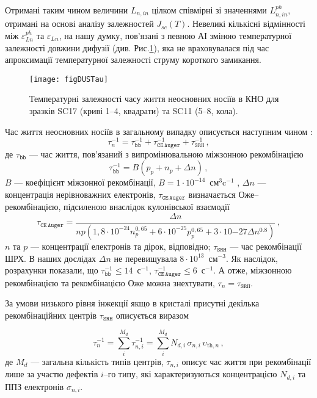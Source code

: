 Отримані таким чином величини $L_{n,in}$ цілком співмірні зі значеннями $L_{n,in}^{ph}$, отримані на основі аналізу залежностей $J_{sc}(T)$.
Невеликі кількісні відмінності між $\varepsilon_{L n}^{ph}$ та $\varepsilon_{L n}$,
на нашу думку, пов'язані з певною АІ зміною температурної залежності довжини дифузії (див. Рис.\ref{figDUSTau}),
яка не враховувалася під час апроксимації температурної залежності струму короткого замикання.


\begin{figure}
\center
\texttt{[image: figDUSTau]}%
\caption{\label{figDUSTau}
Температурні залежності часу життя неосновних носіїв в КНО
для зразків SC17 (криві 1--4, квадрати) та SC11 (5--8, кола).
\FigCaptionSSC
}%
\end{figure}

Час життя неосновних носіїв в загальному випадку описується наступним чином \cite{MurphyJAP2011}:
\begin{equation}
\label{eqTAUsum}
\tau_n^{-1}=\tau_\mathtt{bb}^{-1}+\tau_\mathtt{CE\,Auger}^{-1}+\tau_\mathtt{SRH}^{-1}\,,
\end{equation}
де
$\tau_\mathtt{bb}$ --- час життя, пов'язаний з випромінювальною міжзонною рекомбінацією
\begin{equation}
\label{eqTAUbb}
\tau_\mathtt{bb}^{-1}=B(p_p+n_p+\Delta n)\,,
\end{equation}
$B$ --- коефіцієнт міжзонної рекомбінації, $B=1\cdot10^{-14}$~см$^3$c$^{-1}$ \cite{Si:TAUbb,MurphyJAP2011},
$\Delta n$ --- концентрація нерівноважних електронів,
$\tau_\mathtt{CE\,Auger}$ визначається Оже--рекомбінацією, підсиленою внаслідок кулонівської взаємодії  \cite{Si:TAUAuger}
\begin{equation}
\label{eqTAAuger}
\tau_\mathtt{CE\,Auger}=\frac{\Delta n}{np\left(1,8\cdot10^{-24}n_p^{0,65}+6\cdot10^{-25}p_p^{0,65}+3\cdot10{-27}\Delta n^{0.8}\right)}\,,
\end{equation}
$n$ та $p$ --- концентрації електронів та дірок, відповідно;
$\tau_\mathtt{SRH}$ --- час рекомбінації ШРХ.
В наших дослідах $\Delta n$ не перевищувала $8\cdot10^{13}$~см$^{-3}$.
Як наслідок, розрахунки показали, що $\tau_\mathtt{bb}^{-1}\leq14$~с$^{-1}$, $\tau_\mathtt{CE\,Auger}^{-1}\leq6$~с$^{-1}$.
А отже, міжзонною рекомбінацією та рекомбінацією Оже можна знехтувати, $\tau_n=\tau_\mathtt{SRH}$.

За умови низького рівня інжекції якщо в кристалі присутні декілька рекомбінаційних центрів $\tau_\mathtt{SRH}$ описується виразом

\begin{equation}
\label{eqTAUSHRsum}
\tau_n^{-1}=\sum_i^{M_d}\tau_{n,i}^{-1}=\sum_i^{M_d}N_{d,i}\,\sigma_{n,i}\,\upsilon_{\mathrm{th},n}\,,
\end{equation}
де
$M_d$ --- загальна кількість типів центрів,
$\tau_{n,i}$ описує час життя при рекомбінації лише за участю дефектів $i$--го типу,
які характеризуються концентрацією $N_{d,i}$ та ППЗ електронів $\sigma_{n,i}$.

